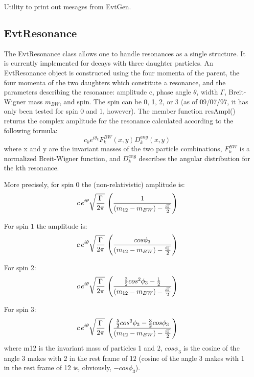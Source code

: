 Utility to print out mesages from EvtGen.

\subsection{EvtResonance}

The EvtResonance class allows one to handle resonances as a single
structure.  It is currently implemented for decays with three 
daughter particles.  An EvtResonance object is constructed using the 
four momenta of the parent, the four momenta of the two daughters
which constitute a resonance, and the parameters describing the 
resonance: amplitude c, phase angle $\theta$, width $\Gamma$, Breit-Wigner 
mass $m_{BW}$, and spin.  The spin can be 0, 1, 2, or 3 (as of 09/07/97, 
it has only been tested for spin 0 and 1, however).  The member function 
resAmpl() returns the complex amplitude for the resonance calculated 
according to the following formula:
\begin{equation}
c_{k}e^{i\theta_{k}}F_{k}^{BW}(x,y)D_{k}^{ang}(x,y)
\end{equation}
where x and y are the invariant masses of the two particle combinations, 
$F_{k}^{BW}$ is a normalized Breit-Wigner function, and 
$D_{k}^{ang}$ describes the angular distribution for the kth resonance.

More precisely, for spin 0 the (non-relativistic) amplitude is:
\begin{equation}
c\,e^{i\theta}\sqrt{\Gamma\over 2\pi}\,\left(\frac{1}{(m_{12}-m_{BW})-\frac{i\Gamma}{2}}\right)
\end{equation}      

For spin 1 the amplitude is:
\begin{equation}
c\,e^{i\theta}\sqrt{\Gamma\over 2\pi}\,\left(\frac{cos\phi_{3}}{(m_{12}-m_{BW})-\frac{i\Gamma}{2}}\right)
\end{equation}      

For spin 2:
\begin{equation}
c\,e^{i\theta}\sqrt{\Gamma\over 2\pi}\,\left(\frac{\frac{3}{2}cos^{2}\phi_{3}-\frac{1}{2}}{(m_{12}-m_{BW})-\frac{i\Gamma}{2}}\right)
\end{equation}      

For spin 3:
\begin{equation}
c\,e^{i\theta}\sqrt{\Gamma\over 2\pi}\,\left(\frac{\frac{5}{2}cos^{3}\phi_{3}-\frac{3}{2}cos\phi_{3}}{(m_{12}-m_{BW})-\frac{i\Gamma}{2}}\right)
\end{equation}      
where m12 is the invariant mass of particles 1 and 2, $cos\phi_{3}$ is the 
cosine of the angle 3 makes with 2 in the rest frame of 12 (cosine of the
angle 3 makes with 1 in the rest frame of 12 is, obviously, $-cos\phi_{3}$).  

